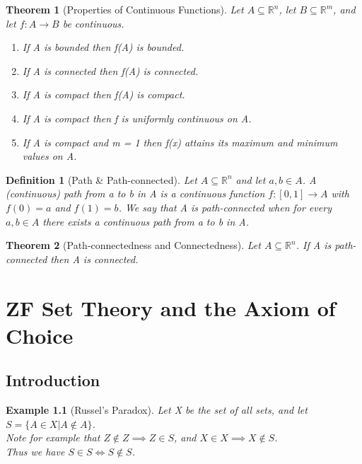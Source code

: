 \documentclass[11pt, oneside]{book}
\theoremstyle{break}
\newtheorem{thm}{Theorem}[section]
\newtheorem{defn}{Definition}[section]
\newtheorem{eg}{Example}[section]
\newcommand{\bb}[1]{\mathbb{#1}}			%
\begin{document}
\begin{thm}[Properties of Continuous Functions]
	Let $A \subseteq \bb{R}^n$, let $B \subseteq \bb{R}^m$, and let $f:A \to B$ be continuous.
	\begin{enumerate}
		\item If A is bounded then f(A) is bounded.
		\item If A is connected then f(A) is connected.
		\item If A is compact then f(A) is compact.
		\item If A is compact then f is uniformly continuous on A.
		\item If A is compact and m = 1 then f(x) attains its maximum and minimum values on A.
	\end{enumerate}
\end{thm}

\begin{defn}[Path \& Path-connected]
	Let $A \subseteq \bb{R}^n$ and let $a, b \in A$. A (continuous) path from a to b in A is a continuous function $f: [0, 1] \to A$ with $f(0) = a$ and $f(1) = b$. We say that A is path-connected when for every $a, b \in A$ there exists a continuous path from a to b in A.
\end{defn}

\begin{thm}[Path-connectedness and Connectedness]
	Let $A \subseteq \bb{R}^n$. If A is path-connected then A is connected.
\end{thm}

\appendix

\chapter{ZF Set Theory and the Axiom of Choice}\label{apdxA}
\section{Introduction}
\begin{eg}[Russel's Paradox]\label{russel_paradox}
	Let X be the set of all sets, and let $S = \{ A \in X | A \notin A\}$.\\
	Note for example that $Z \notin Z \implies Z \in S$, and $X \in X \implies X \notin S$.\\
	Thus we have $S \in S \iff S \notin S$.
\end{eg}
\end{document}
